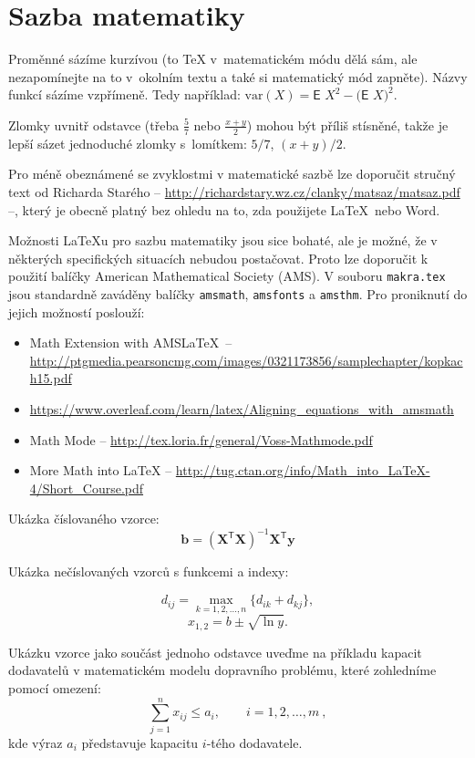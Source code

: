 \section{Sazba matematiky}
Proměnné sázíme kurzívou (to \TeX{} v~matematickém módu dělá sám, ale
nezapomínejte na to v~okolním textu a také si matematický mód zapněte).
Názvy funkcí sázíme vzpřímeně. Tedy například:
$\textrm{var} (X) = \textsf{E~} X^2 - \bigl(\textsf{E~} X \bigr)^2$.

Zlomky uvnitř odstavce (třeba $\frac{5}{7}$ nebo $\frac{x+y}{2}$) mohou
být příliš stísněné, takže je lepší sázet jednoduché zlomky s~lomítkem:
$5/7$, $(x+y)/2$.

Pro méně obeznámené se zvyklostmi v matematické sazbě lze doporučit stručný text od Richarda Starého -- \url{http://richardstary.wz.cz/clanky/matsaz/matsaz.pdf} --, který je obecně platný bez ohledu na to, zda použijete \LaTeX\ nebo Word.

Možnosti \LaTeX u pro sazbu matematiky jsou sice bohaté, ale je možné, že v některých specifických situacích nebudou postačovat. Proto lze doporučit k použití balíčky American Mathematical Society (AMS). V souboru \texttt{makra.tex} jsou standardně zaváděny balíčky \texttt{amsmath}, \texttt{amsfonts} a \texttt{amsthm}. Pro proniknutí do jejich možností poslouží:
\begin{itemize}
\item Math Extension with AMS\LaTeX\ -- \url{http://ptgmedia.pearsoncmg.com/images/0321173856/samplechapter/kopkach15.pdf}
\item \url{https://www.overleaf.com/learn/latex/Aligning_equations_with_amsmath}
\item Math Mode -- \url{http://tex.loria.fr/general/Voss-Mathmode.pdf}
\item More Math into LaTeX -- \url{http://tug.ctan.org/info/Math_into_LaTeX-4/Short_Course.pdf}
\end{itemize}

Ukázka číslovaného vzorce:
\begin{equation}
\mathbf{b}=(\mathbf{X}^\mathsf{T}\mathbf{X})^{-1}\mathbf{X}^\mathsf{T}\mathbf{y}
\end{equation}

Ukázka nečíslovaných vzorců s funkcemi a indexy:

$$
d_{ij}=\max_{k=1,2,\dots,n} \{d_{ik}+d_{kj}\},
$$
$$
x_{1,2}=b \pm \sqrt{\ln y}.
$$

Ukázku vzorce jako součást jednoho odstavce uveďme na příkladu kapacit dodavatelů v matematickém modelu dopravního problému, které zohledníme pomocí omezení:
\begin{equation}
\sum_{j=1}^n x_{ij} \le a_i, \qquad i=1,2,\dots,m\ ,
\end{equation}
\noindent
kde výraz $a_i$ představuje kapacitu $i$-tého dodavatele.

